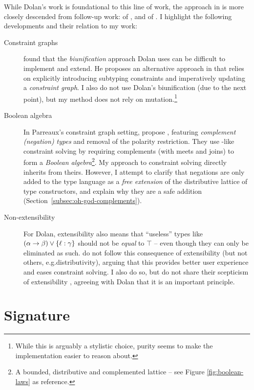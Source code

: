 While Dolan's work is foundational to this line of work, the approach in \inference{} is more closely descended from follow-up work: \simplesub{} of \textcite{simple-sub}, and \mlstruct{} of \textcite{mlstruct}. I highlight the following developments and their relation to my work: \begin{description}
    \item[Constraint graphs] \textcite{simple-sub} found that the \emph{biunification} approach Dolan uses can be difficult to implement and extend. He proposes an alternative approach in \simplesub{} that relies on explicitly introducing subtyping constraints and imperatively updating a \emph{constraint graph}. I also do not use Dolan's biunification (due to the next point), but my method does not rely on mutation.\footnote{While this is arguably a stylistic choice, purity seems to make the implementation easier to reason about.}
    \item[Boolean algebra] In Parreaux's constraint graph setting, \textcite{mlstruct} propose \mlstruct{}, featuring \emph{complement (negation) types} and removal of the polarity restriction. They use \simplesub{}-like constraint solving by requiring complements (with meets and joins) to form a \emph{Boolean algebra}\footnote{A bounded, distributive and complemented lattice -- see Figure \ref{fig:boolean-laws} as reference.}. My approach to constraint solving directly inherits from theirs. However, I attempt to clarify that negations are only added to the type language as a \emph{free extension} of the distributive lattice of type constructors, and explain why they are a safe addition (Section~\ref{subsec:oh-god-complements}).
    \item[Non-extensibility] For Dolan, extensibility also means that \enquote{useless} types like $(\alpha \to \beta) \join \flrec{\ell : \gamma}$ should not be \emph{equal} to $\top$ \cite[Section~1.4.1]{dolan-thesis} -- even though they can only be eliminated as such. \textcite{mlstruct} do not follow this consequence of extensibility (but not others, e.g.\@ distributivity), arguing that this provides better user experience and eases constraint solving. I also do so, but do not share their scepticism of extensibility \cite{simple-sub}, agreeing with Dolan that it is an important principle. 
\end{description}

\section{Signature}
\label{sec:signature}


